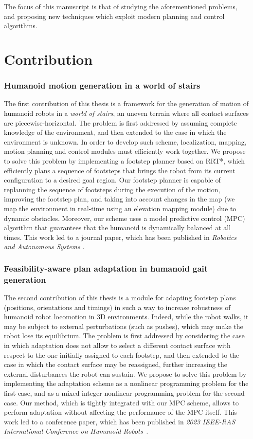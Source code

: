 The focus of this manuscript is that of studying the aforementioned problems,
and proposing new techniques which exploit modern planning and control
algorithms.

\section{Contribution}
\subsubsection{Humanoid motion generation in a world of stairs}
The first contribution of this thesis is a framework for the generation of 
motion of humanoid robots in a \textit{world of stairs}, an uneven terrain 
where all contact surfaces are piecewise-horizontal. The problem is first 
addressed by assuming complete knowledge of the environment, and then 
extended to the case in which the environment is unknown. In order to 
develop such scheme, localization, mapping, motion planning 
and control modules must efficiently work together. We propose to solve this 
problem by implementing a footstep planner based on RRT*, which efficiently 
plans a sequence of footsteps that brings the robot from its current 
configuration to a desired goal region. Our footstep planner is 
capable of replanning the sequence of footsteps during the execution of the 
motion, improving the footstep plan, and taking into account changes 
in the map (we map the environment in real-time using an elevation mapping 
module) due to dynamic obstacles. Moreover, our scheme
uses a model predictive control (MPC) algorithm that guarantees that the humanoid is
dynamically balanced at all times. This work led to a journal paper, which 
has been published in \textit{Robotics and Autonomous Systems} 
\cite{Cipriano2023RAS}.

\subsubsection{Feasibility-aware plan adaptation in humanoid gait generation}
The second contribution of this thesis is a module for adapting footstep plans 
(positions, orientations and timings) in such a way to increase robustness 
of humanoid robot locomotion in 3D environments.
Indeed, while the robot walks, it may be subject 
to external perturbations (such as pushes), which may make the robot lose its 
equilibrium. The problem is first addressed by considering the case in which 
adaptation does not allow to select a different contact surface with respect
to the one initially assigned to each footstep, and then extended to the case 
in which the contact surface may be reassigned, further increasing the external 
disturbances the robot can sustain. We propose to solve this problem by 
implementing the adaptation scheme as a nonlinear programming problem for the
first case, and as a mixed-integer nonlinear programming problem for the
second case. Our method, which is tightly integrated with our MPC scheme,
allows to perform adaptation without affecting the performance of the MPC
itself. This work led to a conference paper, which has been published 
in \textit{2023 IEEE-RAS International Conference on Humanoid
Robots}~\cite{Cipriano2023Humanoids}.

